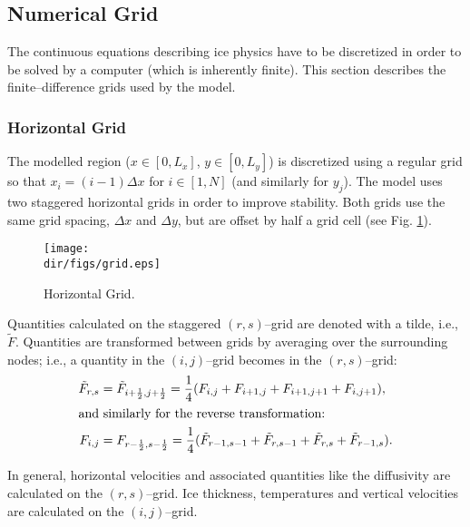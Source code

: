 \subsection{Numerical Grid}\label{num.sec.grid}
The continuous equations describing ice physics have to be discretized in order to be solved by a computer (which is inherently finite). This section describes the finite--difference grids used by the model.
\subsubsection{Horizontal Grid}
The modelled region ($x\in[0,L_x]$, $y\in[0,L_y]$) is discretized using a regular grid so that $x_i=(i-1)\Delta x$ for $i\in[1,N]$ (and similarly for $y_j$). The model uses two staggered horizontal grids in order to improve stability. Both grids use the same grid spacing, $\Delta x$ and $\Delta y$, but are offset by half a grid cell (see Fig. \ref{kin.fig.grid}). 
\begin{figure}[htbp]
  \begin{center}
    \texttt{[image: \\dir/figs/grid.eps]}
    \caption{Horizontal Grid.}
    \label{kin.fig.grid}
  \end{center}
\end{figure}
Quantities calculated on the staggered $(r,s)$--grid are denoted with a tilde, i.e., $\tilde{F}$. Quantities are transformed between grids by averaging over the surrounding nodes; i.e., a quantity in the $(i,j)$--grid becomes in the $(r,s)$--grid:
\begin{subequations}
  \begin{align}
    \tilde{F}_{r,s}&=\tilde{F}_{i+\frac12,j+\frac12}=\frac14(F_{i,j}+F_{i+1,j}+F_{i+1,j+1}+F_{i,j+1}),\\
    \intertext{and similarly for the reverse transformation:}
    F_{i,j}&=F_{r-\frac12,s-\frac12}=\frac14(\tilde{F}_{r-1,s-1}+\tilde{F}_{r,s-1}+\tilde{F}_{r,s}+\tilde{F}_{r-1,s}).
  \end{align}
\end{subequations}

In general, horizontal velocities and associated quantities like the diffusivity are calculated on the $(r,s)$--grid. Ice thickness, temperatures and vertical velocities are calculated on the $(i,j)$--grid.

